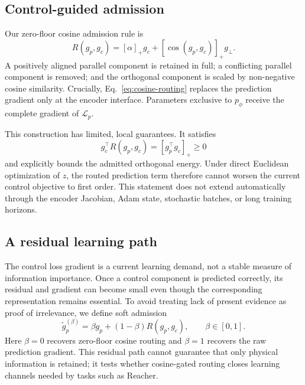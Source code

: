 

\subsection{Control-guided admission}

Our zero-floor cosine admission rule is
\begin{equation}
\label{eq:cosine-routing}
    R(g_p,g_c)=[\alpha]_+g_c+
    [\cos(g_p,g_c)]_+g_\perp.
\end{equation}
A positively aligned parallel component is retained in full; a conflicting
parallel component is removed; and the orthogonal component is scaled by
non-negative cosine similarity.  Crucially, Eq.~\ref{eq:cosine-routing} replaces
the prediction gradient only at the encoder interface.  Parameters exclusive
to $p_\phi$ receive the complete gradient of $\mathcal L_p$.

This construction has limited, local guarantees.  It satisfies
\begin{equation}
    g_c^\top R(g_p,g_c)=[g_p^\top g_c]_+\geq0
\end{equation}
and explicitly bounds the admitted orthogonal energy.  Under direct Euclidean
optimization of $z$, the routed prediction term therefore cannot worsen the
current control objective to first order.  This statement does not extend
automatically through the encoder Jacobian, Adam state, stochastic batches, or
long training horizons.

\subsection{A residual learning path}

The control loss gradient is a current learning demand, not a stable measure
of information importance.  Once a control component is predicted correctly,
its residual and gradient can become small even though the corresponding
representation remains essential.  To avoid treating lack of present evidence
as proof of irrelevance, we define soft admission
\begin{equation}
\label{eq:soft-routing}
    \widetilde g_p^{(\beta)}=
    \beta g_p+(1-\beta)R(g_p,g_c),\qquad \beta\in[0,1].
\end{equation}
Here $\beta=0$ recovers zero-floor cosine routing and $\beta=1$ recovers the raw prediction
gradient.  This residual path cannot guarantee that only physical information
is retained; it tests whether cosine-gated routing closes learning channels needed by
tasks such as Reacher.

